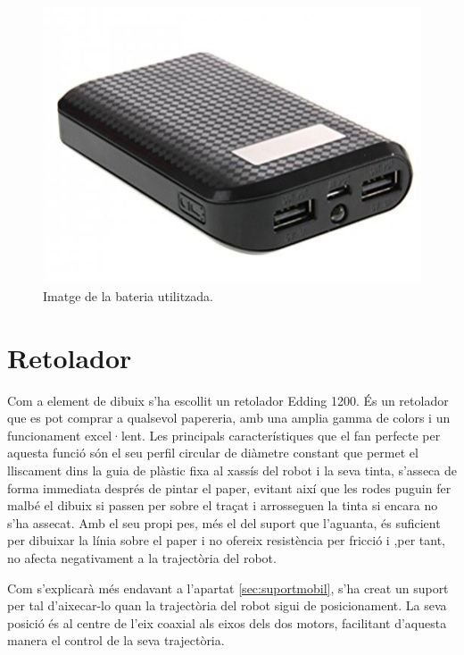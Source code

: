 \begin{figure}[H]
	\centering
	\includegraphics[scale=0.5]{bateria.png}
	\caption{Imatge de la bateria utilitzada.}
	\label{fig:bateria}
\end{figure}

\section{Retolador} \label{sec:retolador}

Com a element de dibuix s’ha escollit un retolador Edding 1200. És un retolador que es pot comprar a qualsevol papereria, amb una amplia gamma de colors i un funcionament excel·lent. Les principals característiques que el fan perfecte per aquesta funció són el seu perfil circular de diàmetre constant que permet el lliscament dins la guia de plàstic fixa al xassís del robot i la seva tinta, s’asseca de forma immediata després de pintar el paper, evitant així que les rodes puguin fer malbé el dibuix si passen per sobre el traçat i arrosseguen la tinta si encara no s'ha assecat. Amb el seu propi pes, més el del suport que l'aguanta, és suficient per dibuixar la línia sobre el paper i no ofereix resistència per fricció i ,per tant, no afecta negativament a la trajectòria del robot. 

Com s’explicarà més endavant a l'apartat \ref{sec:suportmobil}, s’ha creat un suport per tal d’aixecar-lo quan la trajectòria del robot sigui de posicionament. La seva posició és al centre de l’eix coaxial als eixos dels dos motors, facilitant d’aquesta manera el control de la seva trajectòria. 

